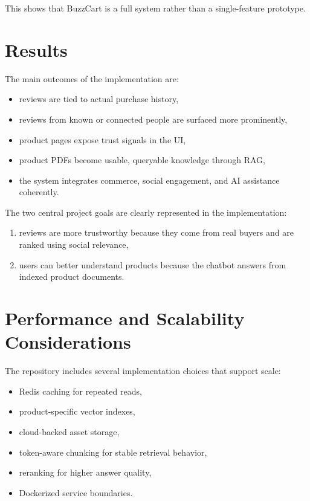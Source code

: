 \documentclass[12pt,letterpaper]{report}
\begin{document}
This shows that BuzzCart is a full system rather than a single-feature prototype.

\section{Results}

The main outcomes of the implementation are:

\begin{itemize}
  \item reviews are tied to actual purchase history,
  \item reviews from known or connected people are surfaced more prominently,
  \item product pages expose trust signals in the UI,
  \item product PDFs become usable, queryable knowledge through RAG,
  \item the system integrates commerce, social engagement, and AI assistance coherently.
\end{itemize}

The two central project goals are clearly represented in the implementation:

\begin{enumerate}
  \item reviews are more trustworthy because they come from real buyers and are ranked using social relevance,
  \item users can better understand products because the chatbot answers from indexed product documents.
\end{enumerate}

\section{Performance and Scalability Considerations}

The repository includes several implementation choices that support scale:

\begin{itemize}
  \item Redis caching for repeated reads,
  \item product-specific vector indexes,
  \item cloud-backed asset storage,
  \item token-aware chunking for stable retrieval behavior,
  \item reranking for higher answer quality,
  \item Dockerized service boundaries.
\end{itemize}
\end{document}
